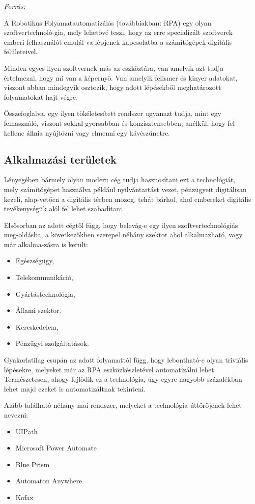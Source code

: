 \textit{Forrás: \cite{book:heuristic}}


A Robotikus Folyamatautomatizálás (továbbiakban: RPA) egy olyan szoftvertechnoló\hyp{}gia, mely lehetővé teszi, hogy az erre specializált szoftverek emberi felhasználót emulál\hyp{}va lépjenek kapcsolatba a számítógépek digitális felületeivel.

Minden egyes ilyen szoftvernek más az eszköztára, van amelyik azt tudja értelmezni, hogy mi van a képernyő. Van amelyik felismer és kinyer adatokat, viszont abban mindegyik osztozik, hogy adott lépésekből meghatározott folyamatokat hajt végre.

Összefoglalva, egy ilyen tökéletesített rendszer ugyanazt tudja, mint egy felhasználó, viszont sokkal gyorsabban és konzisztensebben, anélkül, hogy fel kellene állnia nyújtózni vagy elmenni egy kávészünetre.

\subsection{Alkalmazási területek}

Lényegében bármely olyan modern cég tudja hasznosítani ezt a technológiát, mely számítógépet használva például nyilvántartást vezet, pénzügyeit digitálisan kezeli, alap\hyp{}vetően a digitális térben mozog, tehát bárhol, ahol embereket digitális tevékenységük alól fel lehet szabadítani.

Elsősorban az adott cégtől függ, hogy belevág-e egy ilyen szoftvertechnológiás meg\hyp{}oldásba, a következőkben szerepel néhány szektor ahol alkalmazható, vagy már alkalma\hyp{}zásra is került:
\begin{itemize}
	\item Egészségügy,
	\item Telekommunikáció,
	\item Gyártástechnológia,
	\item Állami szektor,
	\item Kereskedelem,
	\item Pénzügyi szolgáltatások.
\end{itemize}

Gyakorlatilag csupán az adott folyamattól függ, hogy lebontható-e olyan triviális lépésekre, melyeket már az RPA eszközkészletével automatizálni lehet. Természetesen, ahogy fejlődik ez a technológia, úgy egyre nagyobb százalékban lehet majd ezeket is automatizáltnak tekinteni.

Alább található néhány mai rendszer, melyeket a technológia úttörőjének lehet nevezni:
\begin{itemize}
	\item UIPath
	\item Microsoft Power Automate
	\item Blue Prism
	\item Automaton Anywhere
	\item Kofax
\end{itemize}


